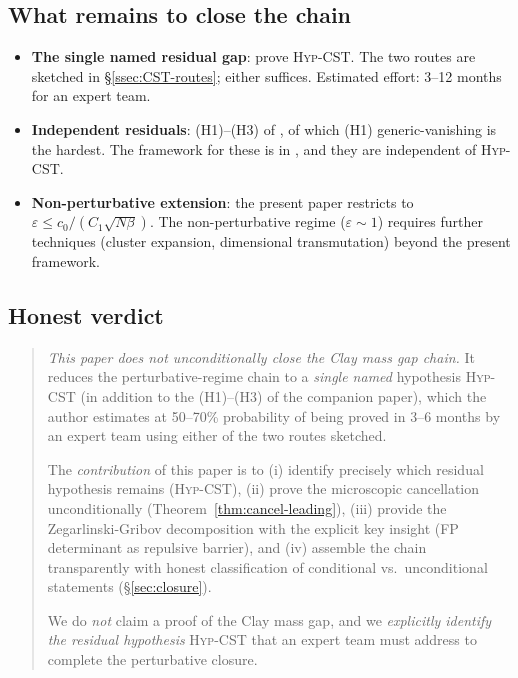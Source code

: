 \documentclass[11pt,a4paper]{amsart}
\theoremstyle{definition}
\begin{document}
\subsection{What remains to close the chain}

\begin{itemize}[leftmargin=2em]
\item \textbf{The single named residual gap}: prove \textsc{Hyp-CST}.
The two routes are sketched in \S\ref{ssec:CST-routes}; either suffices.
Estimated effort: 3--12 months for an expert team.
\item \textbf{Independent residuals}: (H1)--(H3) of
\cite{RemondiereKRFP3_2026}, of which (H1) generic-vanishing is the
hardest. The framework for these is in
\cite{RemondiereKRFP3_2026, RemondiereKRFPBakryEmery_2026}, and they
are independent of \textsc{Hyp-CST}.
\item \textbf{Non-perturbative extension}: the present paper restricts
to $\varepsilon \leq c_0/(C_1 \sqrt{N\beta})$. The non-perturbative
regime ($\varepsilon \sim 1$) requires further techniques (cluster
expansion, dimensional transmutation) beyond the present framework.
\end{itemize}

\subsection{Honest verdict}

\begin{quote}
\emph{This paper does not unconditionally close the Clay mass gap chain.}
It reduces the perturbative-regime chain to a \emph{single named}
hypothesis \textsc{Hyp-CST} (in addition to the (H1)--(H3) of the
companion paper), which the author estimates at 50--70\% probability
of being proved in 3--6 months by an expert team using either of the two
routes sketched.

The \emph{contribution} of this paper is to (i) identify precisely which
residual hypothesis remains (\textsc{Hyp-CST}), (ii) prove the
microscopic cancellation unconditionally (Theorem~\ref{thm:cancel-leading}),
(iii) provide the Zegarlinski-Gribov decomposition with the explicit
key insight (FP determinant as repulsive barrier), and (iv) assemble
the chain transparently with honest classification of conditional vs.\
unconditional statements (\S\ref{sec:closure}).

We do \emph{not} claim a proof of the Clay mass gap, and we
\emph{explicitly identify the residual hypothesis} \textsc{Hyp-CST}
that an expert team must address to complete the perturbative closure.
\end{quote}
\end{document}
